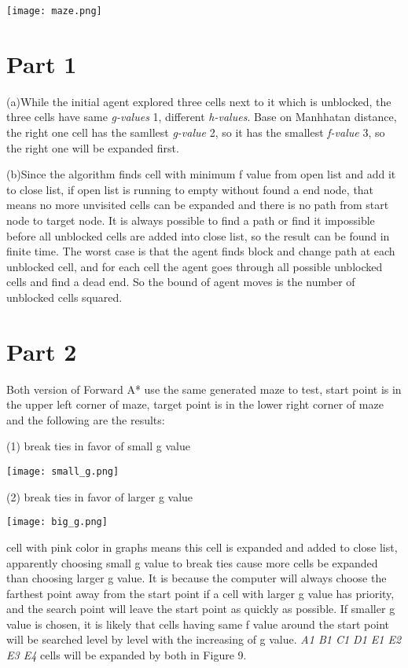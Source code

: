 \documentclass[12pt]{amsart}
\begin{document}
\texttt{[image: maze.png]}

\section*{Part 1}
(a)While the initial agent explored three cells next to it which is unblocked, the three cells have same \emph{g-values} 1, different \emph{h-values}. Base on Manhhatan distance, the right one cell has the samllest \emph{g-value} 2, so it has the smallest \emph{f-value} 3, so the right one will be expanded first.

(b)Since the algorithm finds cell with minimum f value from open list and add it to close list, if open list is running to empty without found a end node, that means no more unvisited cells can be expanded and there is no path from start node to target node. It is always possible to find a path or find it impossible before all unblocked cells are added into close list, so the result can be found in finite time. The worst case is that the agent finds block and change path at each unblocked cell, and for each cell the agent goes through all possible unblocked cells and find a dead end. So the bound of agent moves is the number of unblocked cells squared.

\newpage
\section*{Part 2}
Both version of Forward A* use the same generated maze to test, start point is in the upper left corner of maze, target point is in the lower right corner of maze and the following are the results:

(1) break ties in favor of small g value

\texttt{[image: small\_g.png]}

(2) break ties in favor of larger g value

\texttt{[image: big\_g.png]}

cell with pink color in graphs means this cell is expanded and added to close list, apparently choosing small g value to break ties cause more cells be expanded than choosing larger g value. It is because the computer will always choose the farthest point away from the start point if a cell with larger g value has priority, and the search point will leave the start point as quickly as possible. If smaller g value is chosen, it is likely that cells having same f value around the start point will be searched level by level with the increasing of g value. \emph{A1 B1 C1 D1 E1 E2 E3 E4} cells will be expanded by both in Figure 9.
\newpage
\end{document}
